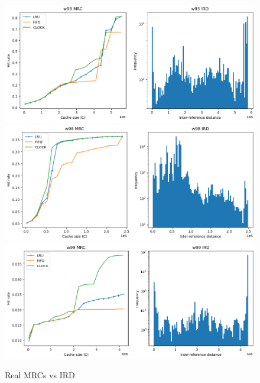 \documentclass{article}
\begin{document}
\begin{figure}[!htb]
\includegraphics[width=0.3\linewidth]{w93.png}\hfill
\includegraphics[width=0.3\linewidth]{w98.png}\hfill
\includegraphics[width=0.3\linewidth]{w99.png}
\caption{Real MRCs vs IRD}
\end{figure}
\end{document}
